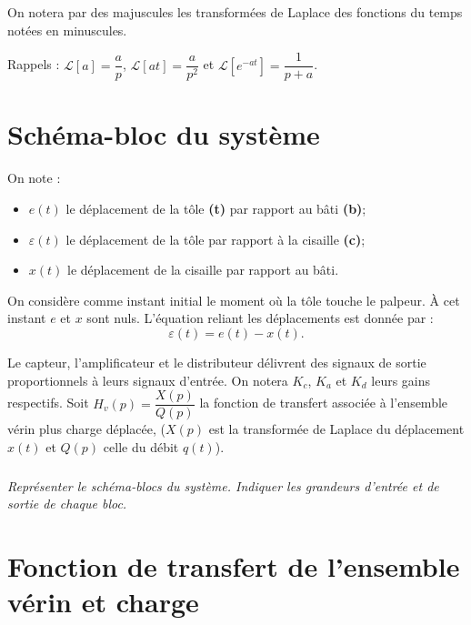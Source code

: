 \documentclass[10pt,fleqn]{article} %
\begin{document}
\begin{multicols}{2}
On notera par des majuscules les transformées de Laplace des fonctions du temps notées en minuscules.

Rappels : $\mathcal{L}\left[a\right]=\dfrac{a}{p}$, $\mathcal{L}\left[at\right]=\dfrac{a}{p^2}$ et $\mathcal{L}\left[e^{-at}\right]=\dfrac{1}{p+a}$. 

\section*{Schéma-bloc du système}
On note : 
\begin{itemize}
\item $e(t)$ le déplacement de la tôle \textbf{(t)} par rapport au bâti \textbf{(b)};
\item $\varepsilon(t)$ le déplacement de la tôle par rapport à la cisaille \textbf{(c)};
\item $x(t)$ le déplacement de la cisaille par rapport au bâti. 
\end{itemize}
On considère comme instant initial le moment où la tôle touche le palpeur. À cet instant $e$ et $x$ sont nuls. L'équation reliant les déplacements est donnée par :
$$\varepsilon(t)=e(t)-x(t).$$


Le capteur, l'amplificateur et le distributeur délivrent des signaux de sortie proportionnels à leurs signaux d'entrée. On notera $K_c$, $K_a$ et $K_d$ leurs gains respectifs. 
Soit  $H_v(p)=\dfrac{X(p)}{Q(p)}$ la fonction de transfert associée à l'ensemble vérin plus charge déplacée, ($X(p)$ est la transformée de Laplace du déplacement $x(t)$ et $Q(p)$ celle du débit $q(t)$).

\subparagraph{}\textit{Représenter le schéma-blocs du système. Indiquer les grandeurs d'entrée et de sortie de chaque bloc.}


\section*{Fonction de transfert de l'ensemble vérin et charge}

\end{multicols}
\end{document}
